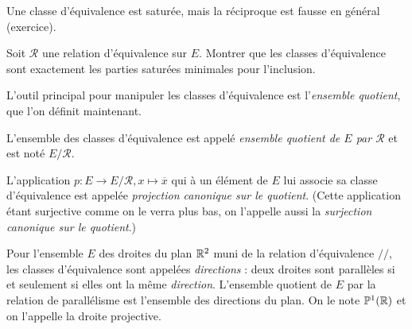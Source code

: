 \begin{exemple}
Une classe d'équivalence est saturée, mais la réciproque est fausse en général (exercice).
\end{exemple}

\begin{exercice}
Soit $\mathcal R$ une relation d'équivalence sur $E$. Montrer que les classes d'équivalence sont exactement les parties saturées minimales pour l'inclusion.
\end{exercice}


L'outil principal pour manipuler les classes d'équivalence est l'\emph{ensemble quotient}, que l'on définit maintenant.

\begin{definition}[Quotient]

L'ensemble des classes d'équivalence est appelé \emph{ensemble quotient de $E$ par $\mathcal R$} et est noté $E/{\mathcal R}$.

L'application $p : E \to E/\mathcal R, x\mapsto \overline{x}$ qui à un élément de $E$ lui associe sa classe d'équivalence est appelée  \emph{projection canonique sur le quotient}. (Cette application étant surjective comme on le verra plus bas, on l'appelle aussi la \emph{surjection canonique sur le quotient}.)
\end{definition}

\begin{exemple}
Pour l'ensemble $E$ des droites du plan $\mathbb{R}^2$ muni de la relation d'équivalence $//$, les classes d'équivalence sont appelées \emph{directions} : deux droites sont parallèles si et seulement si elles ont la même \emph{direction}. L'ensemble quotient de $E$ par la relation de parallélisme est l'ensemble des directions du plan. On le note $\mathbb{P}^1(\mathbb{R})$ et on l'appelle la droite projective.
\end{exemple}

